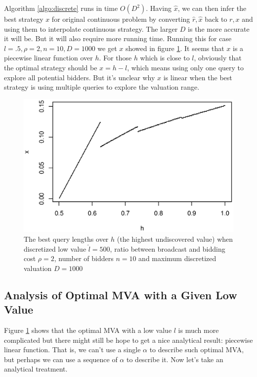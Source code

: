 Algorithm \ref{algo:discrete} runs in time $O(D^2)$. Having $\hat x$, we can
then infer the best strategy $x$ for original continuous problem by converting
$\hat r, \hat x$ back to $r, x$ and using them to interpolate continuous
strategy.  The larger $D$ is the more accurate it will be. But it will also
require more running time.  Running this for case $l = .5, \rho = 2, n = 10, D
= 1000$ we get $x$ showed in figure \ref{fig:x-h}. It seems that $x$ is a
piecewise linear function over $h$.  For those $h$ which is close to
$l$, obviously that the optimal strategy should be $x = h - l$,
which means using only one query to explore all potential bidders. But it's
unclear why $x$ is linear when the best strategy is using multiple queries to
explore the valuation range.

\begin{figure}
\centering
    \includegraphics[trim=0mm 5mm 5mm 15mm, clip, width=\linewidth]{figures/1000-500-2-1-10}
    \caption{The best query lengths over $h$ (the highest
        undiscovered value) when discretized low value $\hat l = 500$,
        ratio between broadcast and bidding cost $\rho = 2$,
        number of bidders $n = 10$ and maximum discretized valuation
        $D = 1000$}\label{fig:x-h}
\end{figure}

\subsection{Analysis of Optimal MVA with a Given Low Value}

Figure \ref{fig:x-h} shows that the optimal MVA with a low value $l$ is
much more complicated but there might still be hope to get a nice analytical
result: piecewise linear function. That is, we can't use a single $\alpha$ to
describe such optimal MVA, but perhaps we can use a sequence of $\alpha$ to
describe it. Now let's take an analytical treatment.

